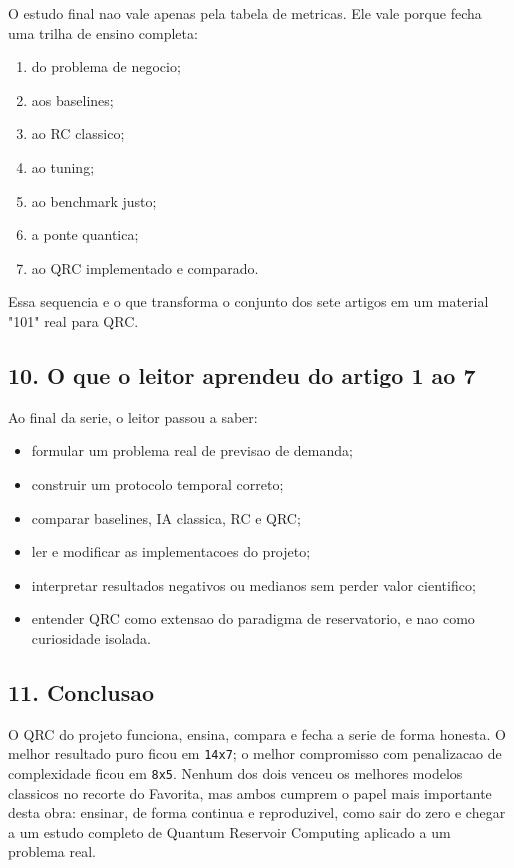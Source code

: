 \documentclass[12pt]{article}
\providecommand{\tightlist}{%
          \setlength{\itemsep}{0pt}\setlength{\parskip}{0pt}}
\begin{document}
O estudo final nao vale apenas pela tabela de metricas. Ele vale porque fecha uma trilha de ensino completa:

\begin{enumerate}
\def\labelenumi{\arabic{enumi}.}
\tightlist
\item
  do problema de negocio;
\item
  aos baselines;
\item
  ao RC classico;
\item
  ao tuning;
\item
  ao benchmark justo;
\item
  a ponte quantica;
\item
  ao QRC implementado e comparado.
\end{enumerate}

Essa sequencia e o que transforma o conjunto dos sete artigos em um material "101" real para QRC.

\subsection{10. O que o leitor aprendeu do artigo 1 ao 7}\label{10-o-que-o-leitor-aprendeu-do-artigo-1-ao-7}

Ao final da serie, o leitor passou a saber:

\begin{itemize}
\tightlist
\item
  formular um problema real de previsao de demanda;
\item
  construir um protocolo temporal correto;
\item
  comparar baselines, IA classica, RC e QRC;
\item
  ler e modificar as implementacoes do projeto;
\item
  interpretar resultados negativos ou medianos sem perder valor cientifico;
\item
  entender QRC como extensao do paradigma de reservatorio, e nao como curiosidade isolada.
\end{itemize}

\subsection{11. Conclusao}\label{11-conclusao}

O QRC do projeto funciona, ensina, compara e fecha a serie de forma honesta. O melhor resultado puro ficou em \texttt{14x7}; o melhor compromisso com penalizacao de complexidade ficou em \texttt{8x5}. Nenhum dos dois venceu os melhores modelos classicos no recorte do Favorita, mas ambos cumprem o papel mais importante desta obra: ensinar, de forma continua e reproduzivel, como sair do zero e chegar a um estudo completo de Quantum Reservoir Computing aplicado a um problema real.
\end{document}
